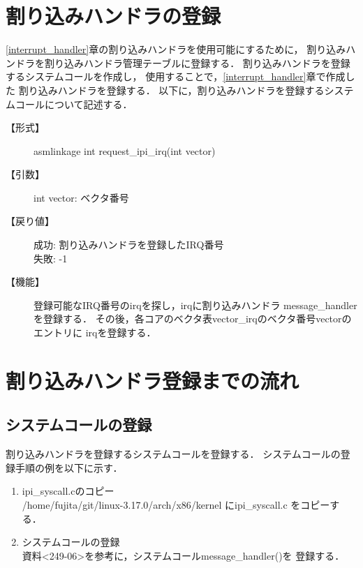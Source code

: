 \documentclass[12pt]{jsarticle}
\begin{document}
\section{割り込みハンドラの登録}
\ref{interrupt_handler}章の割り込みハンドラを使用可能にするために，
割り込みハンドラを割り込みハンドラ管理テーブルに登録する．
割り込みハンドラを登録するシステムコールを作成し，
使用することで，\ref{interrupt_handler}章で作成した
割り込みハンドラを登録する．
以下に，割り込みハンドラを登録するシステムコールについて記述する．
\begin{description}
    \item[【形式】]
        asmlinkage int request_ipi_irq(int vector)
    \item[【引数】]
        int vector: ベクタ番号
    \item[【戻り値】]
        成功: 割り込みハンドラを登録したIRQ番号\\
        失敗: -1\\
    \item[【機能】]
        登録可能なIRQ番号のirqを探し，irqに割り込みハンドラ
        message_handlerを登録する．
        その後，各コアのベクタ表vector_irqのベクタ番号vectorのエントリに
        irqを登録する．
\end{description}

\section{割り込みハンドラ登録までの流れ}
\subsection{システムコールの登録}
割り込みハンドラを登録するシステムコールを登録する．
システムコールの登録手順の例を以下に示す．
\begin{enumerate}
    \item ipi_syscall.cのコピー\\
        /home/fujita/git/linux-3.17.0/arch/x86/kernel にipi_syscall.c
        をコピーする．
    \item システムコールの登録\\
        資料<249-06>を参考に，システムコールmessage_handler()を
        登録する．
        
\end{enumerate}
\end{document}
